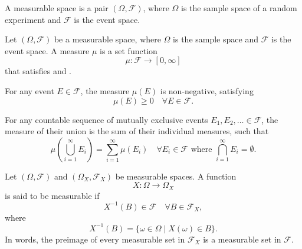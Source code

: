 \begin{definition}
	\label{def:measurable_space}
	A measurable space is a pair $(\Omega, \mathcal{F})$, where $\Omega$ is the sample space of a random experiment and $\mathcal{F}$ is the event space.
\end{definition}

\begin{definition}[Measure]
	\label{def:measure}
	Let $(\Omega, \mathcal{F})$ be a measurable space, where $\Omega$ is the sample space and $\mathcal{F}$ is the event space. A measure $\mu$ is a set function
	\begin{equation}
		\mu: \mathcal{F} \to [0,\infty]
	\end{equation}
	that satisfies  and .
\end{definition}

\begin{axiom}
	\label{ax:non_neg}
	For any event $E\in \mathcal{F}$, the measure $\mu(E)$ is non-negative, satisfying
	\begin{equation}
		\mu(E) \geq 0 \quad \forall E \in  \mathcal{F}.
	\end{equation}
\end{axiom}

\begin{axiom}[Additivity]
	\label{ax:add}
	For any countable sequence of mutually exclusive events $E_1, E_2, \ldots\in \mathcal{F}$, the measure of their union is the sum of their individual measures, such that
	\begin{equation}
		\mu\left(\bigcup_{i=1}^{\infty} \mathit{E}_i\right) = \sum_{i=1}^{\infty} \mu(\mathit{E}_i) \quad \forall \mathit{E}_i \in \mathcal{F} \text{ where } \bigcap_{i=1}^{\infty} \mathit{E}_i = \emptyset.
	\end{equation}
\end{axiom}

\begin{definition}
	\label{def:measurable_function}
	Let $(\Omega,\mathcal{F})$ and $(\Omega_X,\mathcal{F}_X)$ be measurable spaces. A function
	\begin{equation}
		X: \Omega \to \Omega_X
	\end{equation}
	is said to be measurable if
	\begin{equation}
		X^{-1}(B) \in \mathcal{F} \quad \forall B \in \mathcal{F}_X,
	\end{equation}
	where
	\begin{equation}
		X^{-1}(B) = \{\omega \in \Omega \mid X(\omega) \in B\}.
	\end{equation}
	In words, the preimage of every measurable set in $\mathcal{F}_X$ is a measurable set in $\mathcal{F}$.
\end{definition}

